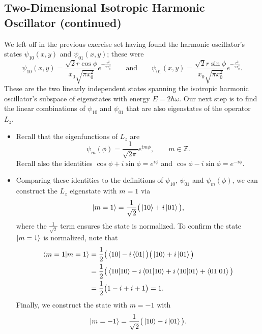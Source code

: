 \documentclass[11pt, a4paper]{article}
\newcommand{\eqtext}[1]{\qquad \text{#1} \qquad}
\begin{document}
\subsection{Two-Dimensional Isotropic Harmonic Oscillator (continued)}
We left off in the previous exercise set having found the harmonic oscillator's states $ \psi_{10}(x,y) $ and $ \psi_{01}(x, y) $; these were
\begin{equation*}
	\psi_{10}(x, y) = \frac{\sqrt{2}r \cos \phi}{x_{0}\sqrt{\pi x_{0}^{2}}}e^{-\frac{r^{2}}{2x_{0}^{2}}} \eqtext{and} \psi_{01}(x, y) = \frac{\sqrt{2}r \sin \phi}{x_{0}\sqrt{\pi x_{0}^{2}}}e^{-\frac{r^{2}}{2x_{0}^{2}}}.
\end{equation*}
These are the two linearly independent states spanning the isotropic harmonic oscillator's subspace of eigenstates with energy $ E = 2\hbar \omega $. Our next step is to find the linear combinations of $ \psi_{10} $ and $ \psi_{01} $ that are also eigenstates of the operator $ L_{z} $. 
	
\vspace{2mm}
\begin{itemize}
	\item Recall that the eigenfunctions of $ L_{z} $ are 
	\begin{equation*}
		\psi_{m}(\phi) = \frac{1}{\sqrt{2\pi}}e^{im\phi}, \qquad m \in \mathbb{Z}.
	\end{equation*}
	Recall also the identities $ \cos \phi + i \sin \phi = e^{i\phi} $ and $ \cos \phi - i \sin \phi = e^{-i\phi} $. 
	
	\item Comparing these identities to the definitions of $ \psi_{10} $, $ \psi_{01} $ and $ \psi_{m}(\phi) $, we can construct the $ L_{z} $ eigenstate with $ m = 1 $ via
	\begin{equation*}
		\ket{m=1} = \frac{1}{\sqrt{2}}\big(\ket{10} + i\ket{01}\big),
	\end{equation*}
	where the $ \frac{1}{\sqrt{2}} $ term ensures the state is normalized. To confirm the state $ \ket{m=1} $ is normalized, note that
	\begin{align*}
		\braket{m=1}{m=1} &= \frac{1}{2}\big(\bra{10} - i\bra{01}\big)\big(\ket{10} + i\ket{01}\big)\\
		&= \frac{1}{2}\big(\braket{10}{10} - i \braket{01}{10} + i\braket{10}{01} + \braket{01}{01}\big)\\
		&=\frac{1}{2}\big(1 -i + i + 1\big) = 1.
	\end{align*}
	Finally, we construct the state with $ m = -1 $ with
	\begin{equation*}
		\ket{m=-1} = \frac{1}{\sqrt{2}} \big(\ket{10} - i \ket{01}\big).
	\end{equation*}
	
\end{itemize}
\end{document}
